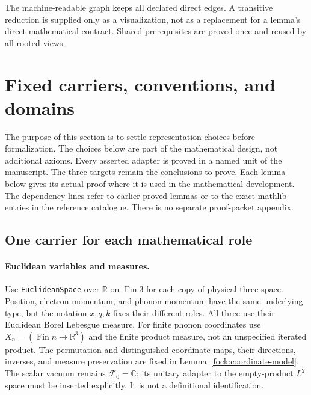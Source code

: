 \documentclass[11pt,a4paper]{article}
\theoremstyle{definition}
\theoremstyle{remark}
\begin{document}
The machine-readable graph keeps all declared direct edges. A
transitive reduction is supplied only as a visualization, not as a
replacement for a lemma's direct mathematical contract. Shared
prerequisites are proved once and reused by all rooted views.


\section{Fixed carriers, conventions, and domains}
\label{sec:translation-design}

The purpose of this section is to settle representation choices before
formalization. The choices below are part of the mathematical design,
not additional axioms. Every asserted adapter is proved in a named unit
of the manuscript. The three targets remain the conclusions to prove.
Each lemma below gives its actual proof where it is used in the
mathematical development. The dependency lines refer to earlier
proved lemmas or to the exact mathlib entries in the reference
catalogue. There is no separate proof-packet appendix.

\subsection{One carrier for each mathematical role}

\paragraph{Euclidean variables and measures.}
Use \nolinkurl{EuclideanSpace} over $\mathbb R$ on
$\operatorname{Fin}3$ for each copy of physical three-space. Position,
electron momentum, and phonon momentum have the same underlying type,
but the notation $x,q,k$ fixes their different roles. All three use
their Euclidean Borel Lebesgue measure. For finite phonon coordinates
use $X_n=(\operatorname{Fin}n\to\mathbb R^3)$ and the finite product
measure, not an unspecified iterated product. The permutation and
distinguished-coordinate maps, their directions, inverses, and measure
preservation are fixed in Lemma~\ref{fock:coordinate-model}.
The scalar vacuum remains $\mathcal F_0=\mathbb C$; its unitary
adapter to the empty-product $L^2$ space must be inserted explicitly.
It is not a definitional identification.
\end{document}
